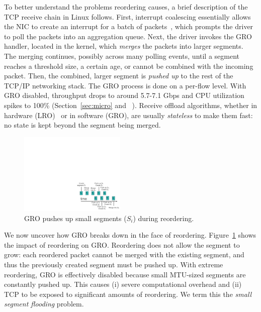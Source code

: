 To better understand the problems reordering causes, a brief description of  
the TCP receive chain in Linux follows. First, interrupt coalescing
essentially allows the NIC to create an interrupt for a batch of packets~\cite{mogul1997eliminating,understanding-linux-network},
which prompts the driver to poll the packets into an aggregation queue. Next, the driver
invokes the GRO handler, located in the kernel, which
{\em merges} the packets into larger segments. The merging continues,
possibly across many polling events, until a segment
reaches a threshold size, a certain age, or cannot be combined with the incoming packet. Then, the
combined, larger segment is {\em pushed up} to the rest of the TCP/IP networking stack. The GRO process is
done on a per-flow level. With GRO disabled, throughput drops to around
5.7-7.1 Gbps and CPU utilization spikes to 100\% (Section~\ref{sec:micro} and ~\cite{bullettrains}). 
Receive offload algorithms, whether in hardware (LRO)~\cite{grossman2005large,open-lro} or in software (GRO), are usually
{\em stateless} to make them fast: no state is kept beyond the segment being merged.



\begin{figure}[t]
        \centering
  \includegraphics[width=0.45\textwidth]{presto/figures/gro-design/gro-break.pdf}
        \caption{GRO pushes up small segments ($S_i$) during reordering.}
        \label{gro-break}
\end{figure}


We now uncover how GRO breaks down in the face of reordering. Figure~\ref{gro-break} shows the impact of reordering on GRO.  Reordering does not allow the segment to grow: each reordered packet cannot be merged with the existing segment, and thus the previously created segment must be pushed up. With extreme reordering, GRO is effectively disabled because small MTU-sized segments are constantly pushed up. This causes (i) severe computational overhead and (ii) TCP to be exposed to significant amounts of reordering. We term this the {\em small segment flooding} problem.

